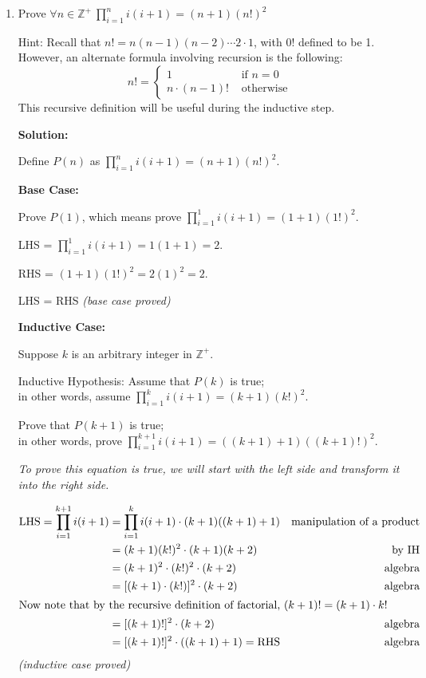\documentclass[11pt, letterpaper]{report}
\newcommand{\Z}{\mathbb{Z}}
\begin{document}
\begin{enumerate}
\item Prove $\displaystyle \forall n \in \Z^+ \ \prod_{i=1}^n i(i+1) = (n+1)(n!)^2$

Hint: Recall that $n!=n(n-1)(n-2)\cdots2\cdot 1$, with $0!$ defined to be 1.  However, an alternate
formula involving recursion is the following:
$$n! = \begin{cases} 1 &\text{ if } n= 0 \\
n \cdot (n-1)! &\text{ otherwise}\end{cases}$$
This recursive definition will be useful during the inductive step.     


\textbf{Solution:}

Define $P(n)$ as $\displaystyle  \prod_{i=1}^n i(i+1) = (n+1)(n!)^2$.

\textbf{Base Case:}

Prove $P(1)$, which means prove $\displaystyle  \prod_{i=1}^1 i(i+1) = (1+1)(1!)^2$.

LHS = $\displaystyle \prod_{i=1}^1 i(i+1) = 1(1+1)=2$.

RHS = $\displaystyle (1+1)(1!)^2=2(1)^2=2$.

LHS = RHS \qquad \textit{(base case proved)}

\textbf{Inductive Case:}

Suppose $k$ is an arbitrary integer in $ \Z^{+}$.

\medskip

Inductive Hypothesis: Assume that $P(k)$ is true; \\in other words, assume
$\displaystyle \prod_{i=1}^k i(i+1) = (k+1)(k!)^2$. 

Prove that $P(k+1)$ is true; \\ \medskip in other words, prove
$\displaystyle \prod_{i=1}^{k+1} i(i+1) = ((k+1)+1)((k+1)!)^2$.

\textit{To prove this equation is true, we will start with the left side and transform it 
into the right side.}

\begin{align*}
\text{LHS}=\prod_{i=1}^{k+1} i(i+1) & = \prod_{i=1}^{k} i(i+1) \cdot (k+1)((k+1)+1) & \text{manipulation of a product}\\
& = (k+1)(k!)^2 \cdot (k+1)(k+2) & \text{by IH}\\
& = (k+1)^2 \cdot (k!)^2 \cdot (k+2) & \text{algebra}\\
& = [(k+1) \cdot (k!)]^2 \cdot (k+2) & \text{algebra}\\
\intertext{Now note that by the recursive definition of factorial, $(k+1)! = (k+1)\cdot k!$}
& = [(k+1)!]^2 \cdot (k+2) & \text{algebra}\\
& = [(k+1)!]^2 \cdot ((k+1)+1)=\text{RHS} & \text{algebra}
\end{align*}
\textit{(inductive case proved)}





\end{enumerate}
\end{document}
